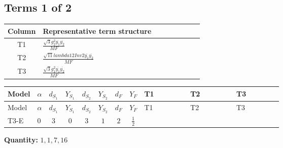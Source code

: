 \documentclass[8pt]{article}
\begin{document}
\begin{landscape}
\subsection*{Terms 1 of 2}
\begin{center}
\begin{tabular}{@{}c >{\raggedright\arraybackslash}p{0.82\linewidth}@{}}
\toprule
Column & Representative term structure \\
\midrule
T1 & \(\displaystyle \frac{\sqrt{3} g_{2}^{2} \overline{y_{1}} \overline{y_{2}}}{MF}\) \\
\midrule
T2 & \(\displaystyle \frac{\sqrt{11} lambda12Inv2 \overline{y_{1}} \overline{y_{2}}}{MF}\) \\
\midrule
T3 & \(\displaystyle \frac{\sqrt{3} g_{1}^{2} \overline{y_{1}} \overline{y_{2}}}{MF}\) \\
\midrule
\bottomrule
\end{tabular}
\end{center}
\smallskip
\tiny
\begin{longtable}{@{}llcccccc >{\raggedright\arraybackslash}p{0.21\linewidth} >{\raggedright\arraybackslash}p{0.21\linewidth} >{\raggedright\arraybackslash}p{0.21\linewidth}@{}}
\toprule
Model & $\alpha$ & $d_{S_1}$ & $Y_{S_1}$ & $d_{S_2}$ & $Y_{S_2}$ & $d_F$ & $Y_F$ & T1 & T2 & T3 \\
\midrule
\endfirsthead
\toprule
Model & $\alpha$ & $d_{S_1}$ & $Y_{S_1}$ & $d_{S_2}$ & $Y_{S_2}$ & $d_F$ & $Y_F$ & T1 & T2 & T3 \\
\midrule
\endhead
T3-E & $0$ & $3$ & $0$ & $3$ & $1$ & $2$ & $\frac{1}{2}$ & \scriptsize\adjustbox{max width=\linewidth}{$\begin{gathered} - \frac{11 \sqrt{3} g_{2}^{2} \overline{y_{1}} \overline{y_{2}}}{8 MF}\end{gathered}$} & \scriptsize\adjustbox{max width=\linewidth}{$\begin{gathered} - \frac{3 \sqrt{11} lambda12Inv2 \overline{y_{1}} \overline{y_{2}}}{22 MF}\end{gathered}$} & \scriptsize\adjustbox{max width=\linewidth}{$\begin{gathered} - \frac{\sqrt{3} g_{1}^{2} \overline{y_{1}} \overline{y_{2}}}{8 MF}\end{gathered}$} \\
\midrule
\bottomrule
\end{longtable}
\clearpage
\noindent\textbf{Quantity: }$\mathrm{1,1,7,16}$\par\smallskip

\end{landscape}
\end{document}
